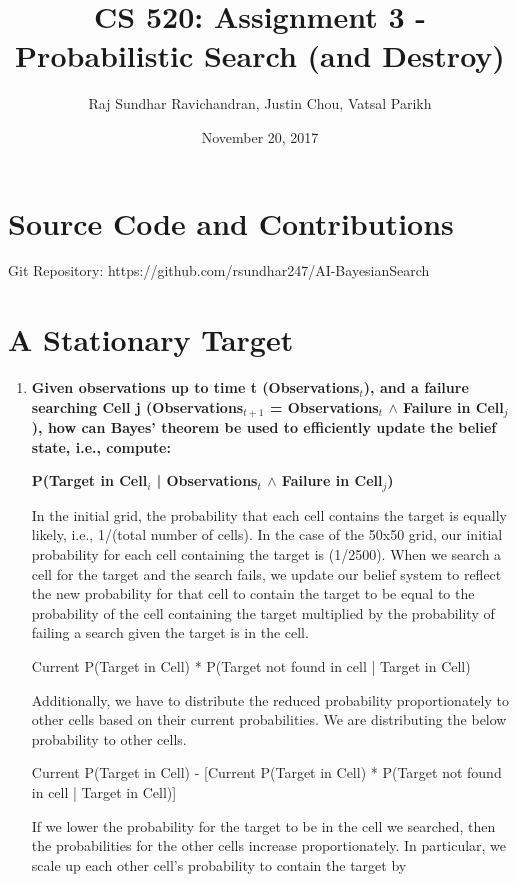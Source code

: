 \documentclass[a4paper]{article}
\title{\textbf{CS 520: Assignment 3 - Probabilistic Search (and Destroy)}}
\author{Raj Sundhar Ravichandran, Justin Chou, Vatsal Parikh}
\date{November 20, 2017}
\begin{document}
\maketitle
\section*{Source Code and Contributions}
Git Repository: https://github.com/rsundhar247/AI-BayesianSearch\\

\section{\textbf{A Stationary Target}}

\begin{enumerate}
\item 
\textbf{Given observations up to time t (Observations$_t$), and a failure searching Cell j (Observations$_{t+1}$ = Observations$_t$ $\wedge$ Failure in Cell$_j$), how can Bayes' theorem be used to efficiently update the belief state, i.e., compute:}
\begin{center}
\textbf{P(Target in Cell$_i$ | Observations$_t$ $\wedge$ Failure in Cell$_j$)}
\end{center}
In the initial grid, the probability that each cell contains the target is equally likely, i.e., 1/(total number of cells). In the case of the 50x50 grid, our initial probability for each cell containing the target is (1/2500). When we search a cell for the target and the search fails, we update our belief system to reflect the new probability for that cell to contain the target to be equal to the probability of the cell containing the target multiplied by the probability of failing a search given the target is in the cell. 
\begin{center}
Current P(Target in Cell) * P(Target not found in cell | Target in Cell)
\end{center}
Additionally, we have to distribute the reduced probability proportionately to other cells based on their current probabilities. We are distributing the below probability to other cells.
\begin{center}
Current P(Target in Cell) - [Current P(Target in Cell) * P(Target not found in cell | Target in Cell)]
\end{center}
If we lower the probability for the target to be in the cell we searched, then the probabilities for the other cells increase proportionately. In particular, we scale up each other cell's probability to contain the target by

\end{enumerate}
\end{document}
